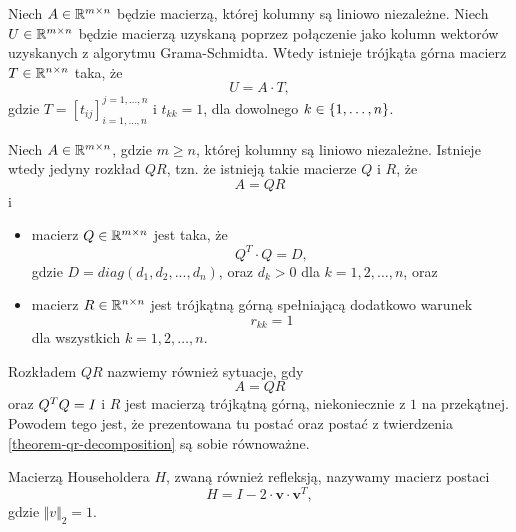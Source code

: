 \documentclass[notheorems]{beamer}
\newcommand{\vr}[1]{\mathbf{#1}}
\newcommand{\mx}[1]{{#1}}
\begin{document}
\begin{frame}
\begin{lemma}\label{lemma-gram-schmidt-matrix}
Niech $\mx{A} \in \setR^{m \times n}$ będzie macierzą, której kolumny są liniowo niezależne. Niech $\mx{U} \in \setR^{m \times n}$ będzie macierzą uzyskaną poprzez połączenie jako kolumn wektorów uzyskanych z algorytmu Grama-Schmidta. Wtedy istnieje trójkąta górna macierz $\mx{T} \in \setR^{n \times n}$ taka, że
$$
\mx{U} = \mx{A} \cdot \mx{T},
$$
gdzie $\mx{T} = [t_{ij}]_{i = 1, \ldots , n}^{j = 1, \ldots, n}$ i $t_{kk} = 1$, dla dowolnego $k \in \left\lbrace {1,\ldots,n} \right\rbrace$.
\end{lemma}
\end{frame}



\begin{frame}
\begin{theorem}[O rozkładzie QR]\label{theorem-qr-decomposition}
Niech $\mx{A} \in \setR^{m \times n}$, gdzie $m\ge n$, której kolumny są liniowo niezależne. Istnieje wtedy jedyny rozkład $\mx{QR}$, tzn. że istnieją takie macierze $\mx{Q}$ i $\mx{R}$, że
$$
\mx{A} = \mx{Q} \mx{R}
$$ 
i
\begin{itemize}
\item macierz $\mx{Q} \in \setR^{m \times n} $ jest taka, że 
$$
Q^{T}\cdot Q=D,
$$
gdzie $D= diag (d_{1}, d_{2}, ..., d_{n})$, oraz $d_{k}>0$ dla $k = 1, 2, \ldots, n$, oraz
\item macierz $\mx{R} \in \setR^{n \times n}$ jest trójkątną górną spełniającą dodatkowo warunek 
$$
r_{kk}= 1 
$$ 
dla wszystkich $k = 1, 2, \ldots, n$.
\end{itemize} 
\end{theorem}
\end{frame}

\begin{frame}
\begin{remark}
Rozkładem $\mx{QR}$ nazwiemy również sytuacje, gdy 
$$
\mx{A}=\mx{Q}\mx{R}
$$
oraz $\transpose{\mx{Q}}\mx{Q}=\mx{I}$ i $\mx{R}$ jest macierzą trójkątną górną, niekoniecznie z $1$ na przekątnej. Powodem tego jest, że prezentowana tu postać oraz postać z twierdzenia \ref{theorem-qr-decomposition} są sobie równoważne.  
\end{remark}
\end{frame}


\begin{frame}
\begin{definition}
Macierzą Householdera $H$, zwaną również refleksją, nazywamy macierz postaci 
$$
\mx{H}=\mx{I}-2\cdot \vr{v}\cdot \vr{v}^{T},
$$
gdzie $\Vert v \Vert_{2} = 1$.
\end{definition}
\end{frame}
\end{document}
